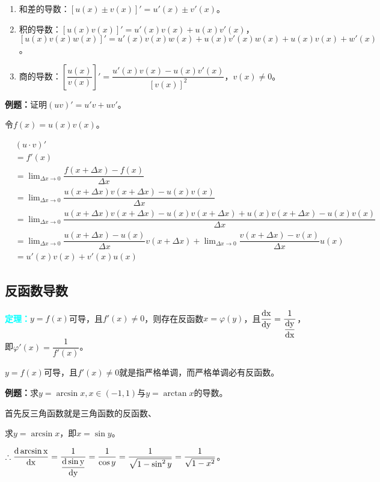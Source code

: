 \documentclass[UTF8, 12pt]{ctexart}
\begin{document}
\begin{enumerate}
    \item 和差的导数：$[u(x)\pm v(x)]'=u'(x)\pm v'(x)$。
    \item 积的导数：$[u(x)v(x)]'=u'(x)v(x)+u(x)v'(x)$，\\ $[u(x)v(x)w(x)]'=u'(x)v(x)w(x)+u(x)v'(x)w(x)+u(x)v(x)+w'(x)$。
    \item 商的导数：$\left[\dfrac{u(x)}{v(x)}\right]'=\dfrac{u'(x)v(x)-u(x)v'(x)}{[v(x)]^2}$，$v(x)\neq 0$。
\end{enumerate}

\textbf{例题：}证明$(uv)'=u'v+uv'$。

令$f(x)=u(x)v(x)$。

$
\begin{aligned}
    & (u\cdot v)' \\
    & =f'(x) \\
    & =\lim_{\Delta x\to 0}\dfrac{f(x+\Delta x)-f(x)}{\Delta x} \\
    & =\lim_{\Delta x\to 0}\dfrac{u(x+\Delta x)v(x+\Delta x)-u(x)v(x)}{\Delta x} \\
    & =\lim_{\Delta x\to 0}\dfrac{u(x+\Delta x)v(x+\Delta x)-u(x)v(x+\Delta x)+u(x)v(x+\Delta x)-u(x)v(x)}{\Delta x} \\
    & =\lim_{\Delta x\to 0}\dfrac{u(x+\Delta x)-u(x)}{\Delta x}v(x+\Delta x) +\lim_{\Delta x\to 0}\dfrac{v(x+\Delta x)-v(x)}{\Delta x}u(x) \\
    & =u'(x)v(x)+v'(x)u(x)
\end{aligned}
$

\subsection{反函数导数}

\textcolor{aqua}{\textbf{定理：}}$y=f(x)$可导，且$f'(x)\neq 0$，则存在反函数$x=\varphi(y)$，且$\dfrac{\rm{d}x}{\rm{d}y}=\dfrac{1}{\dfrac{\rm{d}y}{\rm{d}x}}$，即$\varphi'(x)=\dfrac{1}{f'(x)}$。

$y=f(x)$可导，且$f'(x)\neq 0$就是指严格单调，而严格单调必有反函数。

\textbf{例题：}求$y=\arcsin x,x\in(-1,1)$与$y=\arctan x$的导数。

首先反三角函数就是三角函数的反函数、

求$y=\arcsin x$，即$x=\sin y$。

$\therefore\dfrac{\rm{d}\arcsin x}{\rm{d}x}=\dfrac{1}{\dfrac{\rm{d}\sin y}{\rm{d}y}}=\dfrac{1}{\cos y}=\dfrac{1}{\sqrt{1-\sin^2y}}=\dfrac{1}{\sqrt{1-x^2}}$。
\end{document}
